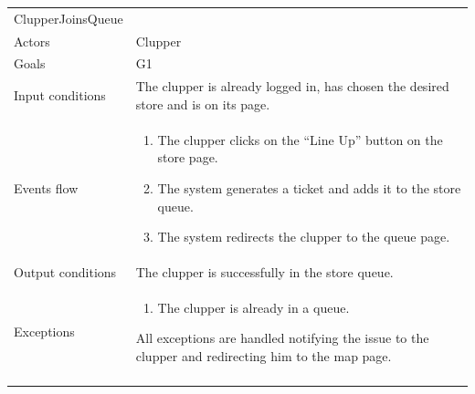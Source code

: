 \begin{longtable}[]{@{}
  >{\raggedright\arraybackslash}p{}
  >{\raggedright\arraybackslash}p{}@{}}
\toprule
ClupperJoinsQueue & \\ \addlinespace
\midrule
\endhead
Actors & Clupper \\ \addlinespace
Goals & G1 \\ \addlinespace
Input conditions & The clupper is already logged in, has chosen the desired store and is on its page. \\ \addlinespace
Events flow & \begin{enumerate}\vspace{-1.35\baselineskip}
    \item The clupper clicks on the ``Line Up'' button on the store page.
    \item The system generates a ticket and adds it to the store queue.
    \item The system redirects the clupper to the queue page. 
\vspace{-1.0\baselineskip}\end{enumerate} \\ \addlinespace
Output conditions & The clupper is successfully in the store queue. \\ \addlinespace
Exceptions & \begin{enumerate}\vspace{-1.35\baselineskip}
    \item The clupper is already in a queue.
\end{enumerate} All exceptions are handled notifying the issue to the clupper and redirecting him to the map page. \\ \addlinespace
\bottomrule
\end{longtable}

